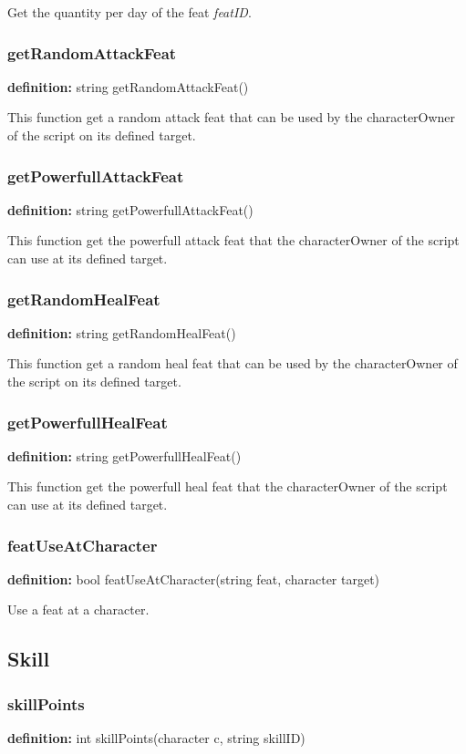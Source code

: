 \documentclass[ letterpaper,12pt]{article}
\begin{document}
Get the quantity per day of the feat {\it featID}.

\subsubsection{getRandomAttackFeat}
{\bf definition:} string getRandomAttackFeat()

This function get a random attack feat that can be used by
the characterOwner of the script on its defined target.

\subsubsection{getPowerfullAttackFeat}
{\bf definition:} string getPowerfullAttackFeat()

This function get the powerfull attack feat that the characterOwner
of the script can use at its defined target.

\subsubsection{getRandomHealFeat}
{\bf definition:} string getRandomHealFeat()

This function get a random heal feat that can be used by
the characterOwner of the script on its defined target.

\subsubsection{getPowerfullHealFeat}
{\bf definition:} string getPowerfullHealFeat()

This function get the powerfull heal feat that the characterOwner
of the script can use at its defined target.

\subsubsection{featUseAtCharacter}
{\bf definition:} bool featUseAtCharacter(string feat, character target)

Use a feat at a character.

\subsection{Skill}

\subsubsection{skillPoints}
{\bf definition:} int skillPoints(character c, string skillID)
\end{document}
